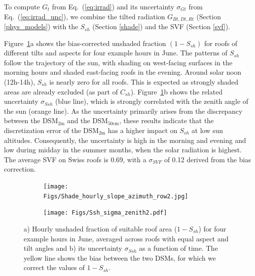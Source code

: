 
To compute $G_t$ from Eq.~(\ref{eq:irrad}) and its uncertainty $\sigma_{Gt}$ from Eq.~(\ref{eq:irrad_unc}), we combine the tilted radiation $G_{Bt,Dt,Rt}$ (Section \ref{phys_models}) with the $S_{sh}$ (Section \ref{shade}) and the SVF (Section \ref{svf}).

Figure~\ref{fig:Sh}a shows the bias-corrected unshaded fraction $(1-S_{sh})$ for roofs of different tilts and aspects for four example hours in June. 
The patterns of $S_{sh}$ follow the trajectory of the sun, with shading on west-facing surfaces in the morning hours and shaded east-facing roofs in the evening.
Around solar noon (12h-14h), $S_{sh}$ is nearly zero for all roofs. This is expected as strongly shaded areas are already excluded (as part of $C_{sh}$). 
Figure~\ref{fig:Sh}b shows the related uncertainty $\sigma_{\mathit{Ssh}}$ (blue line), which is strongly correlated with the zenith angle of the sun (orange line). As the uncertainty primarily arises from the discrepancy between the DSM$_{2\text{m}}$ and the DSM$_{50\text{cm}}$, these results indicate that the discretization error of the DSM$_{2\text{m}}$ has a higher impact on $S_{sh}$ at low sun altitudes.
Consequently, the uncertainty is high in the morning and evening and low during midday in the summer months, when the solar radiation is highest. 
%
The average SVF on Swiss roofs is 0.69, with a $\sigma_{\mathit{SVF}}$ of 0.12 derived from the bias correction.

\begin{figure}[tb]
\centering
\begin{subfigure}{.98\textwidth}
    \centering
    \texttt{[image: Figs/Shade\_hourly\_slope\_azimuth\_row2.jpg]} \subcaption{}
\end{subfigure}
\begin{subfigure}{.98\textwidth}
    \centering
    \texttt{[image: Figs/Ssh\_sigma\_zenith2.pdf]} 
    \subcaption{}
\end{subfigure}
\caption{a) Hourly unshaded fraction of suitable roof area ($1-S_{sh}$) for four example hours in June, averaged across roofs with equal aspect and tilt angles and b) its uncertainty $\sigma_{\mathit{Ssh}}$ as a function of time. The yellow line shows the bias between the two DSMs, for which we correct the values of $1-S_{sh}$.}
\label{fig:Sh}
\end{figure}

